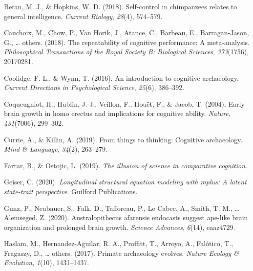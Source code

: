 \documentclass[
  man,floatsintext]{apa6}
\newlength{\cslhangindent}
\newlength{\cslentryspacingunit} %
\newenvironment{CSLReferences}[2] %
 {%
  \setlength{\parindent}{0pt}
  \ifodd #1
  \let\oldpar\par
  \def\par{\hangindent=\cslhangindent\oldpar}
  \fi
  \setlength{\parskip}{#2\cslentryspacingunit}
 }%
 {}
\begin{document}
\begingroup
\setlength{\parindent}{-0.5in}
\setlength{\leftskip}{0.5in}

\hypertarget{refs}{}
\begin{CSLReferences}{1}{0}
\leavevmode{}%
Beran, M. J., \& Hopkins, W. D. (2018). Self-control in chimpanzees relates to general intelligence. \emph{Current Biology}, \emph{28}(4), 574--579.

\leavevmode{}%
Cauchoix, M., Chow, P., Van Horik, J., Atance, C., Barbeau, E., Barragan-Jason, G., \ldots{} others. (2018). The repeatability of cognitive performance: A meta-analysis. \emph{Philosophical Transactions of the Royal Society B: Biological Sciences}, \emph{373}(1756), 20170281.

\leavevmode{}%
Coolidge, F. L., \& Wynn, T. (2016). An introduction to cognitive archaeology. \emph{Current Directions in Psychological Science}, \emph{25}(6), 386--392.

\leavevmode{}%
Coqueugniot, H., Hublin, J.-J., Veillon, F., Houët, F., \& Jacob, T. (2004). Early brain growth in homo erectus and implications for cognitive ability. \emph{Nature}, \emph{431}(7006), 299--302.

\leavevmode{}%
Currie, A., \& Killin, A. (2019). From things to thinking: Cognitive archaeology. \emph{Mind \& Language}, \emph{34}(2), 263--279.

\leavevmode{}%
Farrar, B., \& Ostojic, L. (2019). \emph{The illusion of science in comparative cognition}.

\leavevmode{}%
Geiser, C. (2020). \emph{Longitudinal structural equation modeling with mplus: A latent state-trait perspective}. Guilford Publications.

\leavevmode{}%
Gunz, P., Neubauer, S., Falk, D., Tafforeau, P., Le Cabec, A., Smith, T. M., \ldots{} Alemseged, Z. (2020). Australopithecus afarensis endocasts suggest ape-like brain organization and prolonged brain growth. \emph{Science Advances}, \emph{6}(14), eaaz4729.

\leavevmode{}%
Haslam, M., Hernandez-Aguilar, R. A., Proffitt, T., Arroyo, A., Falótico, T., Fragaszy, D., \ldots{} others. (2017). Primate archaeology evolves. \emph{Nature Ecology \& Evolution}, \emph{1}(10), 1431--1437.


\end{CSLReferences}
\end{document}
